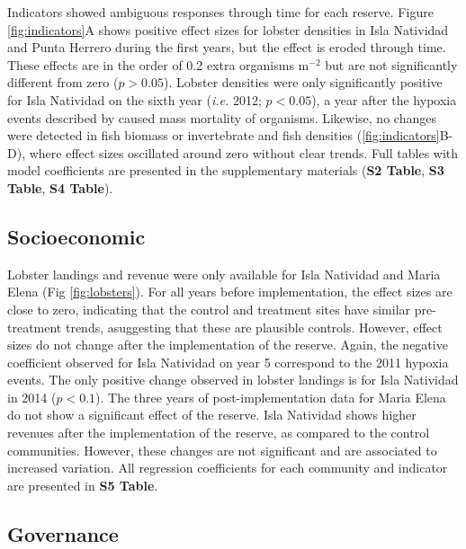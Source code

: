 \documentclass{frontiersSCNS}
\begin{document}
Indicators showed ambiguous responses through time for each reserve.
Figure \ref{fig:indicators}A shows positive effect sizes for lobster
densities in Isla Natividad and Punta Herrero during the first years,
but the effect is eroded through time. These effects are in the order of
0.2 extra organisms \(\mathrm{m}^{-2}\) but are not significantly
different from zero (\(p > 0.05\)). Lobster densities were only
significantly positive for Isla Natividad on the sixth year (\emph{i.e.}
2012; \(p < 0.05\)), a year after the hypoxia events described by
\citet{micheli_2012-EU} caused mass mortality of organisms. Likewise, no
changes were detected in fish biomass or invertebrate and fish densities
(\ref{fig:indicators}B-D), where effect sizes oscillated around zero
without clear trends. Full tables with model coefficients are presented
in the supplementary materials (\textbf{S2 Table}, \textbf{S3 Table},
\textbf{S4 Table}).

\subsection{Socioeconomic}\label{socioeconomic}

Lobster landings and revenue were only available for Isla Natividad and
Maria Elena (Fig \ref{fig:lobsters}). For all years before
implementation, the effect sizes are close to zero, indicating that the
control and treatment sites have similar pre-treatment trends,
asuggesting that these are plausible controls. However, effect sizes do
not change after the implementation of the reserve. Again, the negative
coefficient observed for Isla Natividad on year 5 correspond to the 2011
hypoxia events. The only positive change observed in lobster landings is
for Isla Natividad in 2014 (\(p < 0.1\)). The three years of
post-implementation data for Maria Elena do not show a significant
effect of the reserve. Isla Natividad shows higher revenues after the
implementation of the reserve, as compared to the control communities.
However, these changes are not significant and are associated to
increased variation. All regression coefficients for each community and
indicator are presented in \textbf{S5 Table}.

\subsection{Governance}\label{governance}
\end{document}
